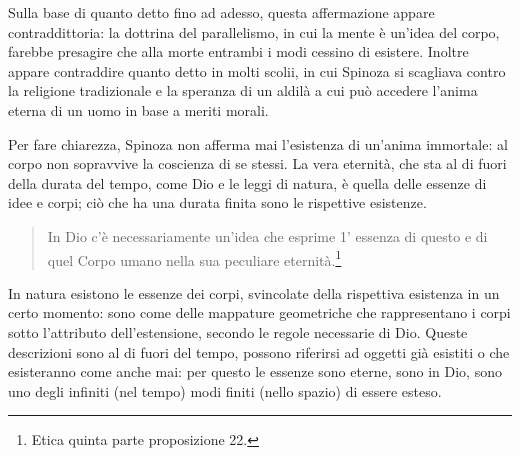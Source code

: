 Sulla base di quanto detto fino ad adesso, questa affermazione appare contraddittoria: la dottrina del parallelismo, in cui la mente è un'idea del corpo, farebbe presagire che alla morte entrambi i modi cessino di esistere. Inoltre appare contraddire quanto detto in molti scolii, in cui Spinoza si scagliava contro la religione tradizionale e la speranza di un aldilà a cui può accedere l'anima eterna di un uomo in base a meriti morali.

Per fare chiarezza, Spinoza non afferma mai l'esistenza di un'anima immortale: al corpo non sopravvive la coscienza di se stessi. La vera eternità, che sta al di fuori della durata del tempo, come Dio e le leggi di natura, è quella delle essenze di idee e corpi; ciò che ha una durata finita sono le rispettive esistenze.

\begin{quotation}
	\small In Dio c’è necessariamente un’idea che esprime 1’ essenza di questo e di quel Corpo umano nella sua peculiare eternità.\footnote{Etica quinta parte proposizione 22.}
\end{quotation}

In natura esistono le essenze dei corpi, svincolate della rispettiva esistenza in un certo momento: sono come delle mappature geometriche che rappresentano i corpi sotto l'attributo dell'estensione, secondo le regole necessarie di Dio. Queste descrizioni sono al di fuori del tempo, possono riferirsi ad oggetti già esistiti o che esisteranno come anche mai: per questo le essenze sono eterne, sono in Dio, sono uno degli infiniti (nel tempo) modi finiti (nello spazio) di essere esteso.

